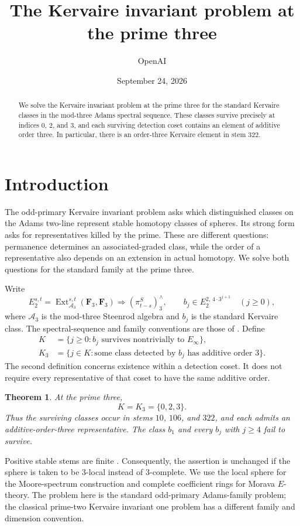 \documentclass[11pt]{article}
\title{The Kervaire invariant problem at the prime three}
\author{OpenAI}
\date{September 24, 2026}
\newtheorem{theorem}{Theorem}[section]
\theoremstyle{definition}
\theoremstyle{remark}
\numberwithin{equation}{section}
\begin{document}
\begin{abstract}
We solve the Kervaire invariant problem at the prime three for the standard Kervaire classes in the mod-three Adams spectral sequence. These classes survive precisely at indices $0$, $2$, and $3$, and each surviving detection coset contains an element of additive order three. In particular, there is an order-three Kervaire element in stem $322$.
\end{abstract}

\section{Introduction}\label{sec:introduction}

The odd-primary Kervaire invariant problem asks which distinguished classes on the Adams two-line represent stable homotopy classes of spheres. Its strong form asks for representatives killed by the prime. These are different questions: permanence determines an associated-graded class, while the order of a representative also depends on an extension in actual homotopy. We solve both questions for the standard family at the prime three.

Write
\[
 E_2^{s,t}=\operatorname{Ext}_{\mathcal A_3}^{s,t}(\mathbf F_3,\mathbf F_3)
 \Longrightarrow (\pi^S_{t-s})^{\wedge}_3,
 \qquad
 b_j\in E_2^{2,\,4\cdot3^{j+1}}\quad(j\geq0),
\]
where $\mathcal A_3$ is the mod-three Steenrod algebra and $b_j$ is the standard Kervaire class. The spectral-sequence and family conventions are those of \cite[Theorems~2.1.1 and~3.4.4]{Ravenel}. Define
\begin{align*}
 K&=\{j\geq0:b_j\text{ survives nontrivially to }E_\infty\},\\
 K_3&=\{j\in K:\text{some class detected by }b_j
                      \text{ has additive order }3\}.
\end{align*}
The second definition concerns existence within a detection coset. It does not require every representative of that coset to have the same additive order.

\begin{theorem}\label{thm:classification}
At the prime three,
\[
                       K=K_3=\{0,2,3\}.
\]
Thus the surviving classes occur in stems $10$, $106$, and $322$, and each admits an additive-order-three representative. The class $b_1$ and every $b_j$ with $j\geq4$ fail to survive.
\end{theorem}

Positive stable stems are finite \cite[Theorem~1.1.8]{Ravenel}. Consequently, the assertion is unchanged if the sphere is taken to be $3$-local instead of $3$-complete. We use the local sphere for the Moore-spectrum construction and complete coefficient rings for Morava $E$-theory. The problem here is the standard odd-primary Adams-family problem; the classical prime-two Kervaire invariant one problem has a different family and dimension convention.
\end{document}
